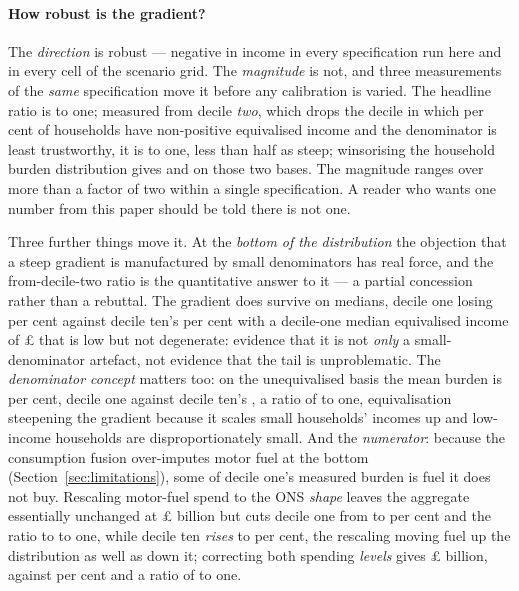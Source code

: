 \paragraph{How robust is the gradient?} The \emph{direction} is robust --- negative in income in every specification run here and in every cell of the scenario grid. The \emph{magnitude} is not, and three measurements of the \emph{same} specification move it before any calibration is varied. The headline ratio is \genDecileRatioPct{} to one; measured from decile \emph{two}, which drops the decile in which \genDecileOneZeroIncomeShare{} per cent of households have non-positive equivalised income and the denominator is least trustworthy, it is \genDecileRatioFromDecileTwoPct{} to one, less than half as steep; winsorising the household burden distribution gives \genDecileRatioWinsorisedPct{} and \genDecileRatioFromDecileTwoWinsorisedPct{} on those two bases. The magnitude ranges over more than a factor of two within a single specification. A reader who wants one number from this paper should be told there is not one.

Three further things move it. At the \emph{bottom of the distribution} the objection that a steep gradient is manufactured by small denominators has real force, and the from-decile-two ratio is the quantitative answer to it --- a partial concession rather than a rebuttal. The gradient does survive on medians, decile one losing \genDecileOneMedianLossPct{} per cent against decile ten's \genDecileTenMedianLossPct{} per cent with a decile-one median equivalised income of \pounds \genDecileOneMedianIncomeGbp{} that is low but not degenerate: evidence that it is not \emph{only} a small-denominator artefact, not evidence that the tail is unproblematic. The \emph{denominator concept} matters too: on the unequivalised basis the mean burden is \genUnequivLossPctIncome{} per cent, decile one \genUnequivDecileOneLossPct{} against decile ten's \genUnequivDecileTenLossPct{}, a ratio of \genUnequivDecileRatioPct{} to one, equivalisation steepening the gradient because it scales small households' incomes up and low-income households are disproportionately small. And the \emph{numerator}: because the consumption fusion over-imputes motor fuel at the bottom (Section~\ref{sec:limitations}), some of decile one's measured burden is fuel it does not buy. Rescaling motor-fuel spend to the ONS \emph{shape} leaves the aggregate essentially unchanged at \pounds \genOnsFuelAggBn{} billion but cuts decile one from \genDecileOneLossPct{} to \genOnsFuelDecileOneLossPct{} per cent and the ratio to \genOnsFuelDecileRatioPct{} to one, while decile ten \emph{rises} to \genOnsFuelDecileTenLossPct{} per cent, the rescaling moving fuel up the distribution as well as down it; correcting both spending \emph{levels} gives \pounds \genOnsLevelsAggBn{} billion, \genOnsLevelsDecileOneLossPct{} against \genOnsLevelsDecileTenLossPct{} per cent and a ratio of \genOnsLevelsDecileRatioPct{} to one.

